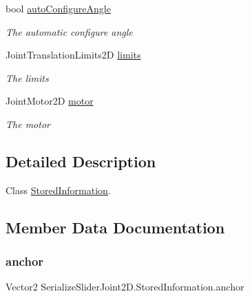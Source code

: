 \begin{DoxyCompactItemize}
bool \hyperlink{class_serialize_slider_joint2_d_1_1_stored_information_a699009abe5d65441acc7baf52c2e7f96}{auto\+Configure\+Angle}
\begin{DoxyCompactList}\small\item\em The automatic configure angle \end{DoxyCompactList}\item 
Joint\+Translation\+Limits2D \hyperlink{class_serialize_slider_joint2_d_1_1_stored_information_ae3c2f502db284d57dc5820d037899748}{limits}
\begin{DoxyCompactList}\small\item\em The limits \end{DoxyCompactList}\item 
Joint\+Motor2D \hyperlink{class_serialize_slider_joint2_d_1_1_stored_information_a93a48365da01cce02a328b35df326eaa}{motor}
\begin{DoxyCompactList}\small\item\em The motor \end{DoxyCompactList}\end{DoxyCompactItemize}


\subsection{Detailed Description}
Class \hyperlink{class_serialize_slider_joint2_d_1_1_stored_information}{Stored\+Information}. 



\subsection{Member Data Documentation}
\mbox{\label{class_serialize_slider_joint2_d_1_1_stored_information_aaccd9811fadff58f2e64e813fe118e09}} 
\subsubsection{\texorpdfstring{anchor}{anchor}}
{\footnotesize\ttfamily Vector2 Serialize\+Slider\+Joint2\+D.\+Stored\+Information.\+anchor}



